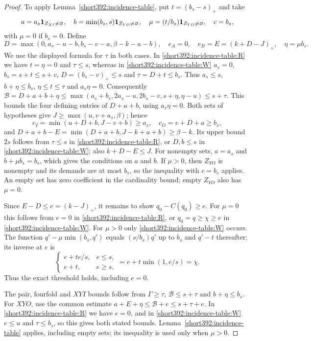 \begin{proof}
To apply Lemma~\ref{short392:incidence-table}, put $t=(b_s-s)_+$ and take
\[
 a=a_s\mathbf 1_{Z_{XI}\ne\varnothing},\quad
 b=\min(b_s,s)\mathbf 1_{Z_{YO}\ne\varnothing},\quad
 \mu=(t/b_s)\mathbf 1_{Z_{YO}\ne\varnothing},\quad c=b_s,
\]
with $\mu=0$ if $b_s=0$. Define
\[
 D=\max(0,a_s-u-b,b_s-v-a,\beta-k-a-b),\quad
 e_A=0,\quad e_B=E=(k+D-J)_+,\quad \eta=\mu b_s.
\]
We use the displayed formula for $\tau$ in both cases. In \ref{short392:incidence-table:R} we have $t=\eta=0$ and $\tau\le s$, whereas in \ref{short392:incidence-table:W} $a_s=0$,
$b_s=s+t\le s+v$, $D=(b_s-v)_+\le s$ and $\tau=D+t\le b_s$.
Thus $a_s\le s$, $b+\eta\le b_s$, $\eta\le t\le\tau$ and $a_s\eta=0$.
Consequently $\mathcal B=D+a+b+\eta \le\max(a_s+b_s,2a_s-u,2b_s-v,s+\eta,\eta-u)\le s+\tau$. This bounds the four defining entries of $D+a+b$, using $a_s\eta=0$.
Both sets of hypotheses give $J\ge\max(u,v+a_s,\beta)$; hence
\[
 c_I=\min(u+D+b,J-v+b)\ge a_s,\quad c_O=v+D+a\ge b_s,
\]
and $D+a+b-E=\min(D+a+b,J-k+a+b)\ge\beta-k$.
Its upper bound $2s$ follows from $\tau\le s$ in \ref{short392:incidence-table:R}, or $D,b\le s$
in \ref{short392:incidence-table:W}; also $k+D-E\le J$.
For nonempty sets, $a=a_s$ and $b+\mu b_s=b_s$, which gives the
conditions on $a$ and $b$. If $\mu>0$, then $Z_{YO}$ is nonempty and its
demands are at most $b_s$, so the inequality with $c=b_s$ applies.
An empty set has zero coefficient in the cardinality bound; empty $Z_{YO}$ also has $\mu=0$.

Since $E-D\le e=(k-J)_+$, it remains to show $q_0-C(q_0)\ge e$.
For $\mu=0$ this follows from $e=0$ in \ref{short392:incidence-table:R}, or $q_0=q\ge\chi\ge e$ in \ref{short392:incidence-table:W}.
For $\mu>0$ only \ref{short392:incidence-table:W} occurs. The function $q'-\mu\min(b_s,q')$
equals $(s/b_s)q'$ up to $b_s$ and $q'-t$ thereafter; its inverse at $e$ is
\[
 \begin{cases}e+te/s,&e\le s,\\e+t,&e\ge s,\end{cases}
                  =e+t\min(1,e/s)=\chi.
\]
Thus the exact threshold holds, including $e=0$.

The pair, fourfold and $XYI$ bounds follow from $\Gamma\ge\tau$,
$\mathcal B\le s+\tau$ and $b+\eta\le b_s$.
For $XYO$, use the common estimate
$a+E+\eta\le\mathcal B+e\le s+\tau+e$.
In \ref{short392:incidence-table:R} we have $e=0$, and in \ref{short392:incidence-table:W} $e\le u$ and $\tau\le b_s$, so this gives both stated bounds. Lemma~\ref{short392:incidence-table}
applies, including empty sets; its inequality is used only when $\mu>0$.
\end{proof}

